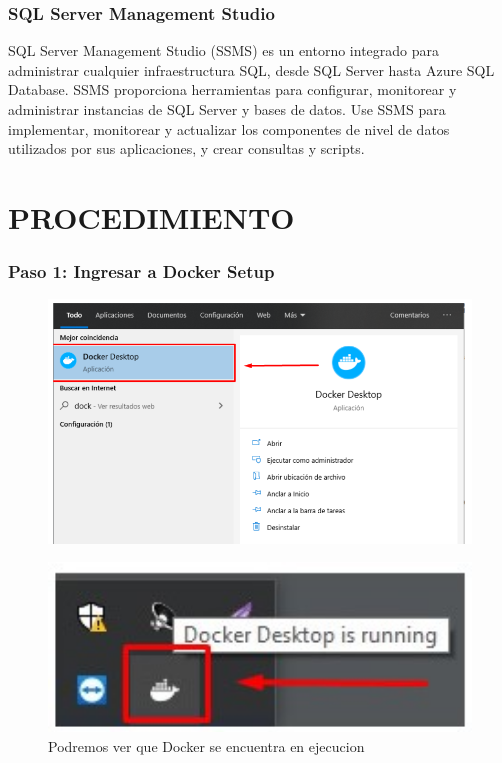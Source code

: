 \documentclass[preprint,12pt]{elsarticle}
\begin{document}
\subsubsection{\textbf{SQL Server Management Studio}}
SQL Server Management Studio (SSMS) es un entorno integrado para administrar cualquier infraestructura SQL, desde SQL Server hasta Azure SQL Database. SSMS proporciona herramientas para configurar, monitorear y administrar instancias de SQL Server y bases de datos. Use SSMS para implementar, monitorear y actualizar los componentes de nivel de datos utilizados por sus aplicaciones, y crear consultas y scripts.


\section{PROCEDIMIENTO}

\subsubsection{\textbf{Paso 1: Ingresar a Docker Setup}}
\begin{figure}[H]
	\begin{center}
		\includegraphics[width=12cm]{./IMAGENES/foto1} 
	\end{center}
\end{figure}

\begin{figure}[H]
	\begin{center}
		\includegraphics[width=12cm]{./IMAGENES/foto2} 
		\caption{Podremos ver que Docker se encuentra en ejecucion}
	\end{center}
\end{figure}
\end{document}
